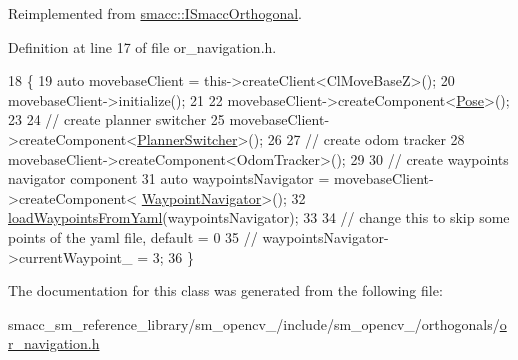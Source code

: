 Reimplemented from \hyperlink{classsmacc_1_1ISmaccOrthogonal_a6bb31c620cb64dd7b8417f8705c79c7a}{smacc\+::\+I\+Smacc\+Orthogonal}.



Definition at line 17 of file or\+\_\+navigation.\+h.


\begin{DoxyCode}
18         \{
19             \textcolor{keyword}{auto} movebaseClient = this->createClient<ClMoveBaseZ>();
20             movebaseClient->initialize();
21 
22             movebaseClient->createComponent<\hyperlink{classcl__move__base__z_1_1Pose}{Pose}>();
23 
24             \textcolor{comment}{// create planner switcher}
25             movebaseClient->createComponent<\hyperlink{classcl__move__base__z_1_1PlannerSwitcher}{PlannerSwitcher}>();
26 
27             \textcolor{comment}{// create odom tracker}
28             movebaseClient->createComponent<OdomTracker>();
29 
30             \textcolor{comment}{// create waypoints navigator component}
31             \textcolor{keyword}{auto} waypointsNavigator = movebaseClient->createComponent<
      \hyperlink{classcl__move__base__z_1_1WaypointNavigator}{WaypointNavigator}>();
32             \hyperlink{classsm__opencv__3_1_1OrNavigation_a50ca7c23fbda3bcfc117fca88fe2dfce}{loadWaypointsFromYaml}(waypointsNavigator);
33 
34             \textcolor{comment}{// change this to skip some points of the yaml file, default = 0}
35             \textcolor{comment}{// waypointsNavigator->currentWaypoint\_ = 3;}
36         \}
\end{DoxyCode}


The documentation for this class was generated from the following file\+:\begin{DoxyCompactItemize}
\item 
smacc\+\_\+sm\+\_\+reference\+\_\+library/sm\+\_\+opencv\+\_/include/sm\+\_\+opencv\+\_/orthogonals/\hyperlink{sm__opencv__3_2include_2sm__opencv__3_2orthogonals_2or__navigation_8h}{or\+\_\+navigation.\+h}\end{DoxyCompactItemize}
